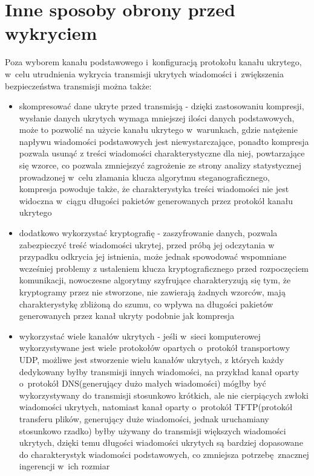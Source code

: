 \documentclass[a4paper, twoside, 12pt]{report}
\begin{document}
    \section{Inne sposoby obrony przed wykryciem}
       Poza wyborem kanału podstawowego i~konfiguracją protokołu kanału ukrytego,
       w~celu utrudnienia wykrycia transmisji ukrytych wiadomości i~zwiększenia
       bezpieczeństwa transmisji można także:
       \begin{itemize}
           \item skompresować dane ukryte przed transmisją - dzięki zastosowaniu
               kompresji, wysłanie danych ukrytych wymaga mniejszej ilości
               danych podstawowych, może to pozwolić na użycie kanału ukrytego
               w~warunkach, gdzie natężenie napływu wiadomości podstawowych
               jest niewystarczające, ponadto kompresja pozwala usunąć z treści
               wiadomości charakterystyczne dla niej, powtarzające się wzorce,
               co pozwala zmniejszyć zagrożenie ze strony analizy statystycznej
               prowadzonej w~celu złamania klucza algorytmu steganograficznego,
               kompresja powoduje także, że charakterystyka treści wiadomości nie jest widoczna
               w~ciągu długości pakietów generowanych przez protokół kanału ukrytego
           \item dodatkowo wykorzystać kryptografię - zaszyfrowanie danych, pozwala
               zabezpieczyć treść wiadomości ukrytej, przed próbą jej odczytania w
               przypadku odkrycia jej istnienia, może jednak spowodować wspomniane
               wcześniej problemy z ustaleniem klucza kryptograficznego przed rozpoczęciem
               komunikacji, nowoczesne algorytmy szyfrujące charakteryzują się
               tym, że kryptogramy przez nie stworzone, nie zawierają żadnych wzorców,
               mają charakterystykę zbliżoną do szumu, co wpływa na długości pakietów
               generowanych przez kanał ukryty podobnie jak kompresja
           \item wykorzystać wiele kanałów ukrytych - jeśli w~sieci komputerowej
               wykorzystywane jest wiele protokołów opartych o~protokół transportowy UDP,
               możliwe jest stworzenie wielu kanałów ukrytych, z których każdy dedykowany
               byłby transmisji innych wiadomości, na przykład kanał oparty o~protokół
               DNS(generujący dużo małych wiadomości)  mógłby być wykorzystywany
               do transmisji stosunkowo krótkich, ale nie cierpiących zwłoki wiadomości
               ukrytych, natomiast kanał oparty o~protokół TFTP(protokół transferu plików,
               generujący duże wiadomości, jednak uruchamiany stosunkowo rzadko)
               byłby używany do transmisji większych wiadomości ukrytych, dzięki
               temu długości wiadomości ukrytych są bardziej dopasowane do charakterystyk
               wiadomości podstawowych, co zmniejsza potrzebę znacznej ingerencji
               w~ich rozmiar


\end{itemize}
\end{document}
